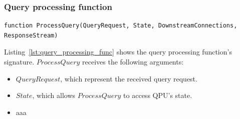 
\subsubsection{Query processing function}



\begin{lstlisting}[caption={Query processing function signature},captionpos=b,label={lst:query_processing_func}]
function ProcessQuery(QueryRequest, State, DownstreamConnections, ResponseStream)
\end{lstlisting}

\noindent
Listing~\ref{lst:query_processing_func} shows the query processing function's signature.
$ProcessQuery$ receives the following arguments:
\begin{itemize}

  \item $QueryRequest$, which represent the received query request.
  \item $State$, which allows $ProcessQuery$ to access QPU's state.







  \item aaa
\end{itemize}


